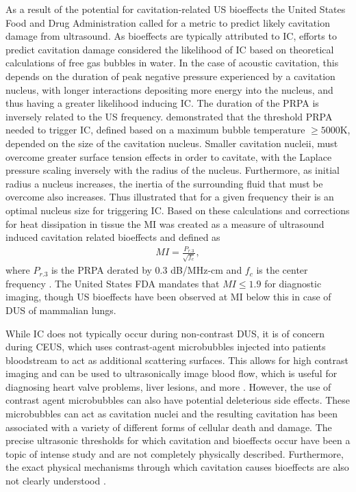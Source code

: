 As a result of the potential for cavitation-related \ac{US} bioeffects
the United States Food and Drug Administration called for a metric to
predict likely cavitation damage from ultrasound. As bioeffects are
typically attributed to \ac{IC}, efforts to predict cavitation damage
considered the likelihood of \ac{IC} based on theoretical calculations
of free gas bubbles in water. In the case of acoustic cavitation, this
depends on the duration of peak negative pressure experienced by a
cavitation nucleus, with longer interactions depositing more energy
into the nucleus, and thus having a greater likelihood inducing
\ac{IC}. The duration of the \ac{PRPA} is inversely related to the
\ac{US} frequency. \cite{Holland1989} demonstrated that the threshold
\ac{PRPA} needed to trigger \ac{IC}, defined based on a maximum bubble
temperature $\geq5000$K, depended on the size of the cavitation
nucleus. Smaller cavitation nucleii, must overcome greater surface
tension effects in order to cavitate, with the Laplace pressure
scaling inversely with the radius of the nucleus. Furthermore, as
initial radius a nucleus increases, the inertia of the surrounding
fluid that must be overcome also increases\cite{AiumS72000}. Thus
\cite{Holland1989} illustrated that for a given frequency their is an
optimal nucleus size for triggering \ac{IC}. Based on these
calculations and corrections for heat dissipation in tissue the
\ac{MI} was created as a measure of ultrasound induced cavitation
related bioeffects and defined as
\begin{align}
  MI = \frac{P_{r.3}}{\sqrt{f_c}},
\end{align}
where $P_{r.3}$ is the \ac{PRPA} derated by $0.3$ dB/MHz-cm and
$f_c$ is the center frequency \cite{Apfel1991}. The United States
\ac{FDA} mandates that $MI\leq1.9$ for diagnostic imaging, though
\ac{US} bioeffects have been observed at \ac{MI} below this in case
of \ac{DUS} of mammalian lungs.

While \ac{IC} does not typically occur during non-contrast \ac{DUS},
it is of concern during \ac{CEUS}, which uses contrast-agent
microbubbles injected into patients bloodstream to act as additional
scattering surfaces. This allows for high contrast imaging and can be
used to ultrasonically image blood flow, which is useful for
diagnosing heart valve problems, liver lesions, and more
\citep{Claudon2013,Rognin2008}. However, the use of contrast agent
microbubbles can also have potential deleterious side effects. These
microbubbles can act as cavitation nuclei and the resulting cavitation
has been associated with a variety of different forms of cellular
death and damage. The precise ultrasonic thresholds for which
cavitation and bioeffects occur have been a topic of intense study and
are not completely physically described. Furthermore, the exact
physical mechanisms through which cavitation causes bioeffects are
also not clearly understood \citep{Barnett1994}.

